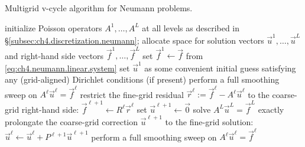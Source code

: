 \begin{algorithm}
\caption{Multigrid v-cycle algorithm for Neumann problems.}
\label{alg:ch4.multigrid.neumann.vcycle}
\begin{algorithmic}
\STATE initialize Poisson operators $A^1, \dotsc, A^L$ at all levels as described in \S\ref{subsec:ch4.discretization.neumann}; allocate space for solution vectors $\vec{u}^1, \dotsc, \vec{u}^L$ and right-hand side vectors $\vec{f}^1, \dotsc, \vec{f}^L$
\STATE set $\vec{f}^1 \leftarrow \vec{f}$ from \eqref{eq:ch4.neumann.linear.system}
\STATE set $\vec{u}^1$ as some convenient initial guess satisfying any (grid-aligned) Dirichlet conditions (if present)
    \STATE perform a full smoothing sweep on $A^{\ell} \vec{u}^{\ell} = \vec{f}^{\ell}$ 
    \STATE restrict the fine-grid residual $\vec{r}^{\ell} := \vec{f}^{\ell} - A^{\ell} \vec{u}^{\ell}$ to the coarse-grid right-hand side: $\vec{f}^{\ell+1} \leftarrow R^{\ell} \vec{r}^{\ell}$ 
    \STATE set $\vec{u}^{\ell+1} \leftarrow \vec{0}$
\ENDFOR
\STATE solve $A^L \vec{u}^L = \vec{f}^L$ exactly 
    \STATE prolongate the coarse-grid correction $\vec{u}^{\ell+1}$ to the fine-grid solution: $\vec{u}^{\ell} \leftarrow \vec{u}^{\ell} + P^{\ell+1} \vec{u}^{\ell+1}$ 
    \STATE perform a full smoothing sweep on $A^{\ell} \vec{u}^{\ell} = \vec{f}^{\ell}$ 
\ENDFOR
\end{algorithmic}
\end{algorithm}

